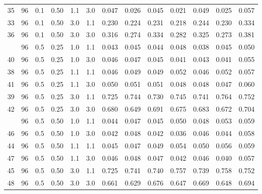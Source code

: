 \begin{longtable}[t]{ccccccrrrrrrc}
35 & 96 & 0.1 & 0.50 & 1.1 & 3.0 & 0.047 & 0.026 & 0.045 & 0.021 & 0.049 & 0.025 & 0.057\\
33 & 96 & 0.1 & 0.50 & 3.0 & 1.1 & 0.230 & 0.224 & 0.231 & 0.218 & 0.244 & 0.230 & 0.334\\
36 & 96 & 0.1 & 0.50 & 3.0 & 3.0 & 0.316 & 0.274 & 0.334 & 0.282 & 0.325 & 0.273 & 0.381\\
\addlinespace
37 & 96 & 0.5 & 0.25 & 1.0 & 1.1 & 0.043 & 0.045 & 0.044 & 0.048 & 0.038 & 0.045 & 0.050\\
40 & 96 & 0.5 & 0.25 & 1.0 & 3.0 & 0.046 & 0.047 & 0.045 & 0.041 & 0.043 & 0.041 & 0.055\\
38 & 96 & 0.5 & 0.25 & 1.1 & 1.1 & 0.046 & 0.049 & 0.049 & 0.052 & 0.046 & 0.052 & 0.057\\
41 & 96 & 0.5 & 0.25 & 1.1 & 3.0 & 0.050 & 0.051 & 0.051 & 0.048 & 0.048 & 0.047 & 0.060\\
39 & 96 & 0.5 & 0.25 & 3.0 & 1.1 & 0.725 & 0.744 & 0.730 & 0.745 & 0.741 & 0.764 & 0.752\\
42 & 96 & 0.5 & 0.25 & 3.0 & 3.0 & 0.680 & 0.649 & 0.691 & 0.675 & 0.683 & 0.672 & 0.704\\
\addlinespace
43 & 96 & 0.5 & 0.50 & 1.0 & 1.1 & 0.044 & 0.047 & 0.045 & 0.050 & 0.048 & 0.053 & 0.059\\
46 & 96 & 0.5 & 0.50 & 1.0 & 3.0 & 0.042 & 0.048 & 0.042 & 0.036 & 0.046 & 0.044 & 0.058\\
44 & 96 & 0.5 & 0.50 & 1.1 & 1.1 & 0.045 & 0.047 & 0.049 & 0.054 & 0.050 & 0.056 & 0.059\\
47 & 96 & 0.5 & 0.50 & 1.1 & 3.0 & 0.046 & 0.048 & 0.047 & 0.042 & 0.046 & 0.040 & 0.057\\
45 & 96 & 0.5 & 0.50 & 3.0 & 1.1 & 0.725 & 0.741 & 0.740 & 0.757 & 0.739 & 0.758 & 0.752\\
48 & 96 & 0.5 & 0.50 & 3.0 & 3.0 & 0.661 & 0.629 & 0.676 & 0.647 & 0.669 & 0.648 & 0.694\\
\bottomrule
\end{longtable}
\endgroup{}